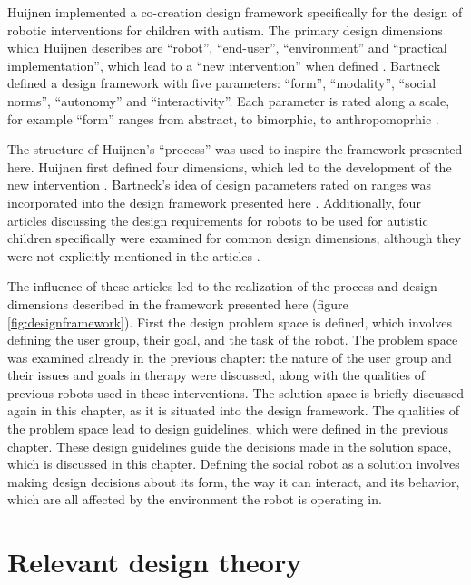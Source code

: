 Huijnen implemented a co-creation design framework specifically for the design of robotic interventions for children with autism. The primary design dimensions which Huijnen describes are ``robot'', ``end-user'', ``environment'' and ``practical implementation'', which lead to a ``new intervention'' when defined \cite{huijnen2017implement}. Bartneck defined a design framework with five parameters: ``form'', ``modality'', ``social norms'', ``autonomy'' and ``interactivity''. Each parameter is rated along a scale, for example ``form'' ranges from abstract, to bimorphic, to anthropomoprhic \cite{bartneck2004design}. 

The structure of Huijnen's ``process'' was used to inspire the framework presented here. Huijnen first defined four dimensions, which led to the development of the new intervention \cite{huijnen2017implement}. Bartneck's idea of design parameters rated on ranges was incorporated into the design framework presented here \cite{bartneck2004design}. Additionally, four articles discussing the design requirements for robots to be used for autistic children specifically were examined for common design dimensions, although they were not explicitly mentioned in the articles \cite{designSpaces, giullian2010detailed, michaud2003characteristics, robins2007eliciting}.

The influence of these articles led to the realization of the process and design dimensions described in the framework presented here (figure \ref{fig:designframework}). First the design problem space is defined, which involves defining the user group, their goal, and the task of the robot. The problem space was examined already in the previous chapter: the nature of the user group and their issues and goals in therapy were discussed, along with the qualities of previous robots used in these interventions. The solution space is briefly discussed again in this chapter, as it is situated into the design framework. The qualities of the problem space lead to design guidelines, which were defined in the previous chapter. These design guidelines guide the decisions made in the solution space, which is discussed in this chapter. Defining the social robot as a solution involves making design decisions about its form, the way it can interact, and its behavior, which are all affected by the environment the robot is operating in.





\section{Relevant design theory}

